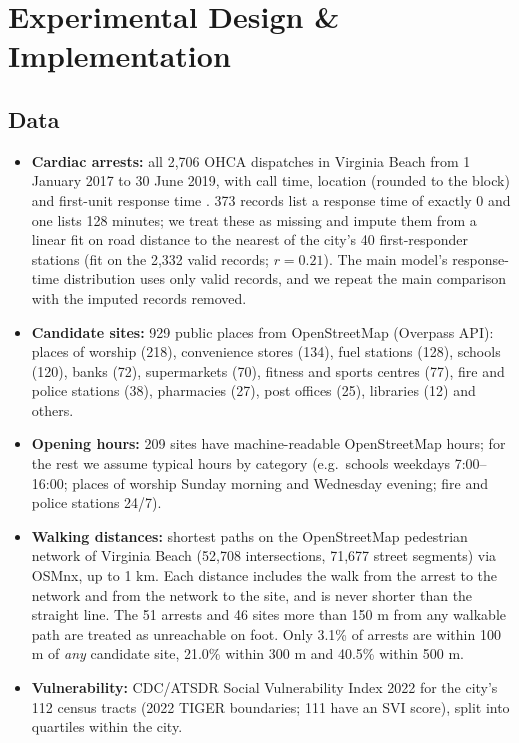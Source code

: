 \documentclass[11pt]{article}
\begin{document}
\section{Experimental Design \& Implementation}

\subsection{Data}
\begin{itemize}
\item \textbf{Cardiac arrests:} all 2{,}706 OHCA dispatches in Virginia Beach from 1 January 2017 to 30 June 2019, with call time, location (rounded to the block) and first-unit response time \cite{custodio2022}. 373 records list a response time of exactly 0 and one lists 128 minutes; we treat these as missing and impute them from a linear fit on road distance to the nearest of the city's 40 first-responder stations (fit on the 2{,}332 valid records; $r=0.21$). The main model's response-time distribution uses only valid records, and we repeat the main comparison with the imputed records removed.
\item \textbf{Candidate sites:} 929 public places from OpenStreetMap (Overpass API): places of worship (218), convenience stores (134), fuel stations (128), schools (120), banks (72), supermarkets (70), fitness and sports centres (77), fire and police stations (38), pharmacies (27), post offices (25), libraries (12) and others.
\item \textbf{Opening hours:} 209 sites have machine-readable OpenStreetMap hours; for the rest we assume typical hours by category (e.g.\ schools weekdays 7:00--16:00; places of worship Sunday morning and Wednesday evening; fire and police stations 24/7).
\item \textbf{Walking distances:} shortest paths on the OpenStreetMap pedestrian network of Virginia Beach (52{,}708 intersections, 71{,}677 street segments) via OSMnx, up to 1 km. Each distance includes the walk from the arrest to the network and from the network to the site, and is never shorter than the straight line. The 51 arrests and 46 sites more than 150 m from any walkable path are treated as unreachable on foot. Only 3.1\% of arrests are within 100 m of \emph{any} candidate site, 21.0\% within 300 m and 40.5\% within 500 m.
\item \textbf{Vulnerability:} CDC/ATSDR Social Vulnerability Index 2022 \cite{flanagan2011} for the city's 112 census tracts (2022 TIGER boundaries; 111 have an SVI score), split into quartiles within the city.
\end{itemize}
\end{document}
